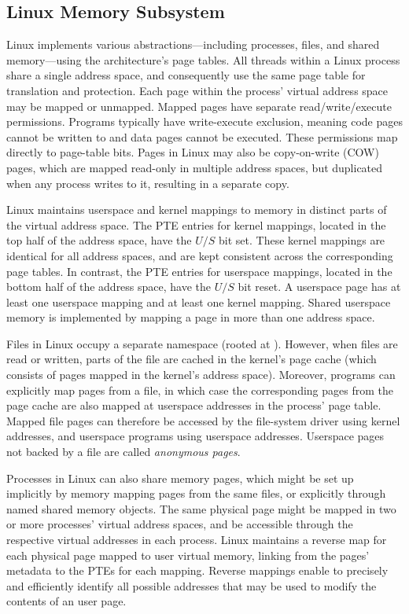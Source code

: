 \subsection{Linux Memory Subsystem}

Linux implements various abstractions---including processes, files, and shared
memory---using the architecture's page tables.
All threads within a Linux process share a single address space, and
consequently use the same page table for translation and protection.
Each page within the process' virtual address space may be mapped or
unmapped. 
Mapped pages have separate read/write/execute permissions.
Programs typically have write-execute exclusion, meaning
code pages cannot be written to and data pages cannot be executed.
These permissions map directly to page-table bits.
Pages in Linux may also be copy-on-write (COW) pages, which are mapped 
read-only in multiple address spaces, but duplicated when any process writes
to it, resulting in a separate copy.

Linux maintains userspace and kernel mappings to memory in distinct
parts of the virtual address space.
The PTE entries for kernel mappings, located in the top half of the
address space, have the $U/S$ bit set.
These kernel mappings are identical for all address spaces, and are
kept consistent across the corresponding page tables.
In contrast, the PTE entries for userspace mappings, located in the 
bottom half of the address space, have the $U/S$ bit reset.
A userspace page has at least one userspace mapping and at least one
kernel mapping.
Shared userspace memory is implemented by mapping a page in more than
one address space.

Files in Linux occupy a separate namespace (rooted at \Code{/}).
However, when files are read or written, parts of the file are cached
in the kernel's page cache (which consists of pages mapped in the kernel's
address space).
Moreover, programs can explicitly map pages from a file, in which case
the corresponding pages from the page cache are also mapped at userspace
addresses in the process' page table.
Mapped file pages can therefore be accessed by the file-system driver using
kernel addresses, and userspace programs using userspace addresses.
Userspace pages not backed by a file are called \emph{anonymous pages}.

Processes in Linux can also share memory pages, which might be set up
implicitly by memory mapping pages from the same files, or explicitly
through named shared memory objects.
The same physical page might be mapped in two or more processes'
virtual address spaces, and be accessible through the respective
virtual addresses in each process.
Linux maintains a reverse map for each physical page mapped to user virtual
memory, linking from the pages' metadata to the PTEs for each mapping.
Reverse mappings enable \midas to precisely and efficiently identify all 
possible addresses that may be used to modify the contents of an user page.


